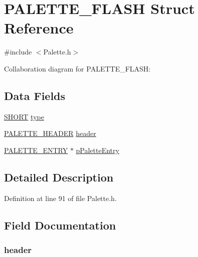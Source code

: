\hypertarget{struct_p_a_l_e_t_t_e___f_l_a_s_h}{}\section{P\+A\+L\+E\+T\+T\+E\+\_\+\+F\+L\+A\+S\+H Struct Reference}
\label{struct_p_a_l_e_t_t_e___f_l_a_s_h}


{\ttfamily \#include $<$Palette.\+h$>$}



Collaboration diagram for P\+A\+L\+E\+T\+T\+E\+\_\+\+F\+L\+A\+S\+H\+:
\subsection*{Data Fields}
\begin{DoxyCompactItemize}
\item 
\hyperlink{_generic_type_defs_8h_ae9bb25d3afecf3bfab0fbe3c22c2050f}{S\+H\+O\+R\+T} \hyperlink{struct_p_a_l_e_t_t_e___f_l_a_s_h_a06d50a20f32a049972021c00b4ced77d}{type}
\item 
\hyperlink{struct_p_a_l_e_t_t_e___h_e_a_d_e_r}{P\+A\+L\+E\+T\+T\+E\+\_\+\+H\+E\+A\+D\+E\+R} \hyperlink{struct_p_a_l_e_t_t_e___f_l_a_s_h_a54cb907c8c766d26c97508b6e01e6e3e}{header}
\item 
\hyperlink{_palette_8h_a267788ed14b1625d98f625627c16d98c}{P\+A\+L\+E\+T\+T\+E\+\_\+\+E\+N\+T\+R\+Y} $\ast$ \hyperlink{struct_p_a_l_e_t_t_e___f_l_a_s_h_a4f405f95a6b502c1b6ba3fbb17b18631}{p\+Palette\+Entry}
\end{DoxyCompactItemize}


\subsection{Detailed Description}


Definition at line 91 of file Palette.\+h.



\subsection{Field Documentation}
\hypertarget{struct_p_a_l_e_t_t_e___f_l_a_s_h_a54cb907c8c766d26c97508b6e01e6e3e}{}
\subsubsection[{header}]{ header}\label{struct_p_a_l_e_t_t_e___f_l_a_s_h_a54cb907c8c766d26c97508b6e01e6e3e}


